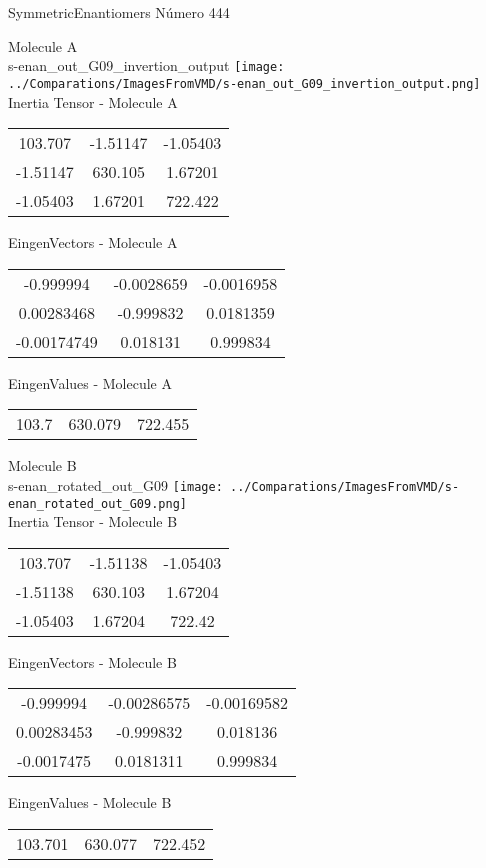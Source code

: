 \vtab[-2cm]
\begin{center}
{\large SymmetricEnantiomers \tab Número 444}
\end{center}
\begin{multicols}{2}
\begin{center}

Molecule A \\ 
s-enan\_out\_G09\_invertion\_output
\texttt{[image: ../Comparations/ImagesFromVMD/s-enan\_out\_G09\_invertion\_output.png]}
\\
Inertia Tensor - Molecule A \\
\vtab

\begin{tabular}{|c c c|}
103.707	 & 	-1.51147	 & 	-1.05403	 \\
-1.51147	 & 	630.105	 & 	1.67201	 \\
-1.05403	 & 	1.67201	 & 	722.422
\end{tabular}

\vtab
 EingenVectors - Molecule A     \\
\vtab
\begin{tabular}{|c c c|}
-0.999994	 & 	-0.0028659	 & 	-0.0016958	 \\
0.00283468	 & 	-0.999832	 & 	0.0181359	 \\
-0.00174749	 & 	0.018131	 & 	0.999834
\end{tabular}

\vtab
 EingenValues - Molecule A     \\
\vtab
\begin{tabular}{|c c c|}
103.7	 & 	630.079	 & 	722.455	 \\
\end{tabular}
\columnbreak

Molecule B \\ 
s-enan\_rotated\_out\_G09
\texttt{[image: ../Comparations/ImagesFromVMD/s-enan\_rotated\_out\_G09.png]}
\\
Inertia Tensor - Molecule B \\
\vtab

\begin{tabular}{|c c c|}
103.707	 & 	-1.51138	 & 	-1.05403	 \\
-1.51138	 & 	630.103	 & 	1.67204	 \\
-1.05403	 & 	1.67204	 & 	722.42
\end{tabular}

\vtab
 EingenVectors - Molecule B     \\
\vtab
\begin{tabular}{|c c c|}
-0.999994	 & 	-0.00286575	 & 	-0.00169582	 \\
0.00283453	 & 	-0.999832	 & 	0.018136	 \\
-0.0017475	 & 	0.0181311	 & 	0.999834
\end{tabular}

\vtab
 EingenValues - Molecule B     \\
\vtab
\begin{tabular}{|c c c|}
103.701	 & 	630.077	 & 	722.452	 \\
\end{tabular}

\end{center}
\end{multicols}

